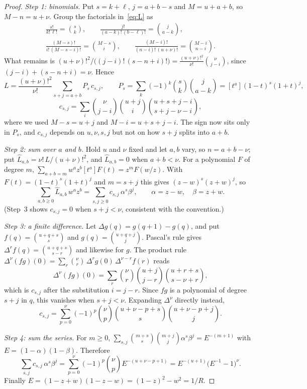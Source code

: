 \documentclass[11pt]{amsart}
\theoremstyle{remark}
\newcommand{\coef}[1]{[#1]}
\begin{document}
\begin{proof}
\emph{Step 1: binomials.} Put $s=k+\ell$, $j=a+b-s$ and $M=u+a+b$, so $M-n=u+\nu$. Group the factorials in~\eqref{eq:L} as
\[
\begin{gathered}
 \frac{s!}{k!\,\ell!}=\binom sk,\qquad \frac{j!}{(a-k)!\,(b-\ell)!}=\binom j{a-k},\\
 \frac{(M-s)!}{i!\,(M-s-i)!}=\binom{M-s}i,\qquad \frac{(M-i)!}{(n-i)!\,(u+\nu)!}=\binom{M-i}{n-i}.
\end{gathered}
\]
What remains is $(u+\nu)!^2/\bigl((j-i)!\,(s-n+i)!\bigr)=\frac{(u+\nu)!^2}{\nu!}\binom\nu{j-i}$, since $(j-i)+(s-n+i)=\nu$. Hence
\[
 L=\frac{(u+\nu)!^2}{\nu!}\sum_{s+j=a+b}P_s\,c_{s,j},\qquad
 P_s=\sum_k(-1)^k\binom sk\binom j{a-k}=\coef{t^a}(1-t)^s(1+t)^j,
\]
\[
 c_{s,j}=\sum_i\binom\nu{j-i}\binom{u+j}i\binom{u+s+j-i}{s+j-\nu-i},
\]
where we used $M-s=u+j$ and $M-i=u+s+j-i$. The sign now sits only in $P_s$, and $c_{s,j}$ depends on $u,\nu,s,j$ but not on how $s+j$ splits into $a+b$.

\emph{Step 2: sum over $a$ and $b$.} Hold $u$ and $\nu$ fixed and let $a,b$ vary, so $n=a+b-\nu$; put $\widehat L_{a,b}=\nu!\,L/(u+\nu)!^2$, and $\widehat L_{a,b}=0$ when $a+b<\nu$. For a polynomial $F$ of degree $m$, $\sum_{a+b=m}w^az^b\coef{t^a}F(t)=z^mF(w/z)$. With $F(t)=(1-t)^s(1+t)^j$ and $m=s+j$ this gives $(z-w)^s(z+w)^j$, so
\[
 \sum_{a,b\ge0}\widehat L_{a,b}\,w^az^b=\sum_{s,j\ge0}c_{s,j}\,\alpha^s\beta^j,\qquad \alpha=z-w,\quad\beta=z+w.
\]
(Step~3 shows $c_{s,j}=0$ when $s+j<\nu$, consistent with the convention.)

\emph{Step 3: a finite difference.} Let $\Delta g(q)=g(q+1)-g(q)$, and put $f(q)=\binom{u+q+s}s$ and $g(q)=\binom{u+q+j}j$. Pascal's rule gives $\Delta^rf(q)=\binom{u+q+s}{s-r}$ and likewise for $g$. The product rule $\Delta^\nu(fg)(0)=\sum_r\binom\nu r\,\Delta^rg(0)\,\Delta^{\nu-r}f(r)$ reads
\[
 \Delta^\nu(fg)(0)=\sum_r\binom\nu r\binom{u+j}{j-r}\binom{u+r+s}{s-\nu+r},
\]
which is $c_{s,j}$ after the substitution $i=j-r$. Since $fg$ is a polynomial of degree $s+j$ in $q$, this vanishes when $s+j<\nu$. Expanding $\Delta^\nu$ directly instead,
\[
 c_{s,j}=\sum_{p=0}^\nu(-1)^p\binom\nu p\binom{u+\nu-p+s}s\binom{u+\nu-p+j}j.
\]

\emph{Step 4: sum the series.} For $m\ge0$, $\sum_{s,j}\binom{m+s}s\binom{m+j}j\alpha^s\beta^j=E^{-(m+1)}$ with $E=(1-\alpha)(1-\beta)$. Therefore
\[
 \sum_{s,j}c_{s,j}\,\alpha^s\beta^j=\sum_{p=0}^\nu(-1)^p\binom\nu p E^{-(u+\nu-p+1)}=E^{-(u+1)}\bigl(E^{-1}-1\bigr)^\nu.
\]
Finally $E=(1-z+w)(1-z-w)=(1-z)^2-w^2=1/R$.
\end{proof}
\end{document}
